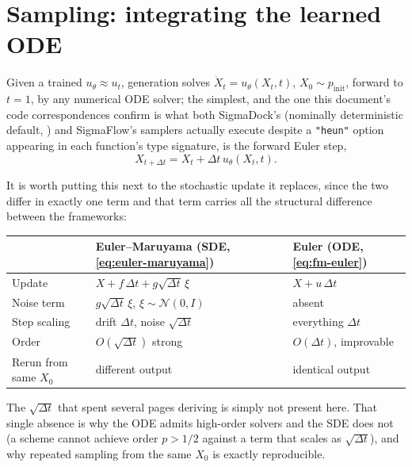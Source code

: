 \documentclass[11pt,a4paper]{report}
\theoremstyle{definition}
\theoremstyle{remark}
\begin{document}
\section{Sampling: integrating the learned ODE}
\label{sec:cfm-sampling-scratch}

Given a trained $u_\theta\approx u_t$, generation solves
$\dot X_t=u_\theta(X_t,t)$, $X_0\sim p_{\mathrm{init}}$, forward to $t=1$,
by any numerical ODE solver; the simplest, and the one this document's
code correspondences confirm is what both SigmaDock's (nominally deterministic
default, ) and SigmaFlow's samplers actually
execute despite a \texttt{"heun"} option appearing in each function's type
signature, is the forward Euler step,
\begin{equation}
\label{eq:fm-euler}
X_{t+\Delta t} = X_t + \Delta t\,u_\theta(X_t,t) .
\end{equation}

It is worth putting this next to the stochastic update it replaces, since
the two differ in exactly one term and that term carries all the
structural difference between the frameworks:

\begin{center}
\begin{tabular}{lll}
\toprule
& \textbf{Euler--Maruyama} (SDE, \eqref{eq:euler-maruyama}) & \textbf{Euler} (ODE, \eqref{eq:fm-euler}) \\
\midrule
Update & $X + f\,\Delta t + g\sqrt{\Delta t}\,\xi$ & $X + u\,\Delta t$ \\
Noise term & $g\sqrt{\Delta t}\,\xi$, $\xi\sim\mathcal N(0,I)$ & absent \\
Step scaling & drift $\Delta t$, noise $\sqrt{\Delta t}$ & everything $\Delta t$ \\
Order & $O(\sqrt{\Delta t})$ strong & $O(\Delta t)$, improvable \\
Rerun from same $X_0$ & different output & identical output \\
\bottomrule
\end{tabular}
\end{center}

The $\sqrt{\Delta t}$ that  spent several pages
deriving is simply not present here. That single absence is why the ODE
admits high-order solvers and the SDE does not (a scheme cannot achieve
order $p>1/2$ against a term that scales as $\sqrt{\Delta t}$), and why
repeated sampling from the same $X_0$ is exactly reproducible.
\end{document}
